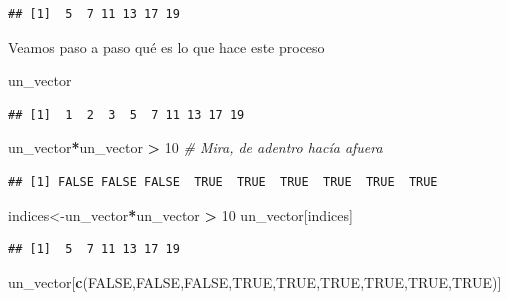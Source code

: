 \documentclass[
]{book}
\newenvironment{Shaded}{\begin{snugshade}}{\end{snugshade}}
\newcommand{\CommentTok}[1]{\textcolor[rgb]{0.56,0.35,0.01}{\textit{#1}}}
\newcommand{\ConstantTok}[1]{\textcolor[rgb]{0.56,0.35,0.01}{#1}}
\newcommand{\DecValTok}[1]{\textcolor[rgb]{0.00,0.00,0.81}{#1}}
\newcommand{\FunctionTok}[1]{\textcolor[rgb]{0.13,0.29,0.53}{\textbf{#1}}}
\newcommand{\NormalTok}[1]{#1}
\newcommand{\OtherTok}[1]{\textcolor[rgb]{0.56,0.35,0.01}{#1}}
\newcommand{\SpecialCharTok}[1]{\textcolor[rgb]{0.81,0.36,0.00}{\textbf{#1}}}
\begin{document}
\begin{verbatim}
## [1]  5  7 11 13 17 19
\end{verbatim}

Veamos paso a paso qué es lo que hace este proceso

\begin{Shaded}
\begin{Highlighting}[]
\NormalTok{un\_vector}
\end{Highlighting}
\end{Shaded}

\begin{verbatim}
## [1]  1  2  3  5  7 11 13 17 19
\end{verbatim}

\begin{Shaded}
\begin{Highlighting}[]
\NormalTok{un\_vector}\SpecialCharTok{*}\NormalTok{un\_vector }\SpecialCharTok{\textgreater{}} \DecValTok{10}    \CommentTok{\# Mira, de adentro hacía afuera}
\end{Highlighting}
\end{Shaded}

\begin{verbatim}
## [1] FALSE FALSE FALSE  TRUE  TRUE  TRUE  TRUE  TRUE  TRUE
\end{verbatim}

\begin{Shaded}
\begin{Highlighting}[]
\NormalTok{indices}\OtherTok{\textless{}{-}}\NormalTok{un\_vector}\SpecialCharTok{*}\NormalTok{un\_vector }\SpecialCharTok{\textgreater{}} \DecValTok{10} 
\NormalTok{un\_vector[indices]}
\end{Highlighting}
\end{Shaded}

\begin{verbatim}
## [1]  5  7 11 13 17 19
\end{verbatim}

\begin{Shaded}
\begin{Highlighting}[]
\NormalTok{un\_vector[}\FunctionTok{c}\NormalTok{(}\ConstantTok{FALSE}\NormalTok{,}\ConstantTok{FALSE}\NormalTok{,}\ConstantTok{FALSE}\NormalTok{,}\ConstantTok{TRUE}\NormalTok{,}\ConstantTok{TRUE}\NormalTok{,}\ConstantTok{TRUE}\NormalTok{,}\ConstantTok{TRUE}\NormalTok{,}\ConstantTok{TRUE}\NormalTok{,}\ConstantTok{TRUE}\NormalTok{)]}
\end{Highlighting}
\end{Shaded}
\end{document}
